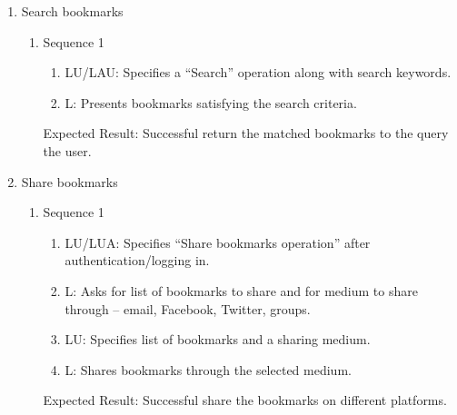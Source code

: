 \documentclass[11pt]{report} %
\begin{document}
\begin{enumerate}
\item
	Search bookmarks
		\begin{enumerate}
			\item
				Sequence 1
					\begin{enumerate}
						\item
							LU/LAU: Specifies a ``Search'' operation along with search keywords.
						\item
							L: Presents bookmarks satisfying the search criteria.				
					\end{enumerate}	
				Expected Result: Successful return the matched bookmarks to the query the user.							
		\end{enumerate}


\item
	Share bookmarks
		\begin{enumerate}
			\item
				Sequence 1
					\begin{enumerate}
						\item
							LU/LUA: Specifies “Share bookmarks operation” after authentication/logging in.
						\item
							L: Asks for list of bookmarks to share and for medium to share through – email, Facebook, Twitter, groups.
						\item
							LU: Specifies list of bookmarks and a sharing medium.
						\item
							L: Shares bookmarks through the selected medium.
					\end{enumerate}
				Expected Result: Successful share the bookmarks on different platforms.					
		\end{enumerate}


\end{enumerate}
\end{document}

